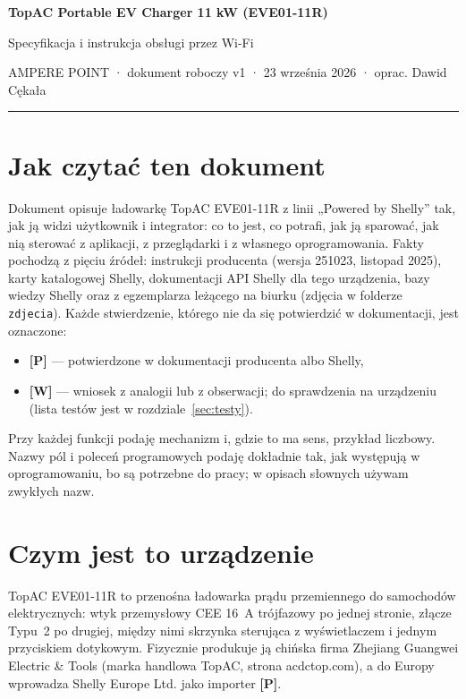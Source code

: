 \documentclass[11pt,a4paper]{article}
\newcommand{\tagP}{\textcolor{apgreen}{\textbf{[P]}}}
\newcommand{\tagW}{\textcolor{apamber}{\textbf{[W]}}}
\newcommand{\code}[1]{\texttt{#1}}
\begin{document}
{\LARGE\bfseries TopAC Portable EV Charger 11 kW (EVE01-11R)\par}
{\Large Specyfikacja i instrukcja obsługi przez Wi-Fi\par}
\vspace{2pt}
{\small AMPERE POINT · dokument roboczy v1 · 23 września 2026 · oprac. Dawid Cękała\par}
\vspace{4pt}\textcolor{apteal}{\rule{\textwidth}{1.2pt}}

\section*{Jak czytać ten dokument}

Dokument opisuje ładowarkę TopAC EVE01-11R z linii „Powered by Shelly” tak, jak ją widzi użytkownik i integrator: co to jest, co potrafi, jak ją sparować, jak nią sterować z aplikacji, z przeglądarki i z własnego oprogramowania. Fakty pochodzą z pięciu źródeł: instrukcji producenta (wersja 251023, listopad 2025), karty katalogowej Shelly, dokumentacji API Shelly dla tego urządzenia, bazy wiedzy Shelly oraz z egzemplarza leżącego na biurku (zdjęcia w folderze \code{zdjecia}). Każde stwierdzenie, którego nie da się potwierdzić w dokumentacji, jest oznaczone:

\begin{itemize}
\item \tagP{} — potwierdzone w dokumentacji producenta albo Shelly,
\item \tagW{} — wniosek z analogii lub z obserwacji; do sprawdzenia na urządzeniu (lista testów jest w rozdziale~\ref{sec:testy}).
\end{itemize}

Przy każdej funkcji podaję mechanizm i, gdzie to ma sens, przykład liczbowy. Nazwy pól i poleceń programowych podaję dokładnie tak, jak występują w oprogramowaniu, bo są potrzebne do pracy; w opisach słownych używam zwykłych nazw.

\tableofcontents

\section{Czym jest to urządzenie}

TopAC EVE01-11R to przenośna ładowarka prądu przemiennego do samochodów elektrycznych: wtyk przemysłowy CEE 16~A trójfazowy po jednej stronie, złącze Typu~2 po drugiej, między nimi skrzynka sterująca z wyświetlaczem i jednym przyciskiem dotykowym. Fizycznie produkuje ją chińska firma Zhejiang Guangwei Electric \& Tools (marka handlowa TopAC, strona acdctop.com), a do Europy wprowadza Shelly Europe Ltd. jako importer \tagP.
\end{document}
